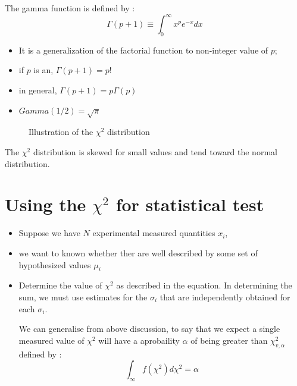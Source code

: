 \documentclass[a4paper,10pt]{article}
\begin{document}
The gamma function is defined by : 
\begin{equation}
  \Gamma (p +1)  \equiv \int^{\infty}_{0} x^p e^{-x} dx
 \end{equation}
 
 
\begin{itemize}
 \item It is a generalization of the factorial function to non-integer value of $p$;
 \item if $p$ is an, $\Gamma(p+1) = p!$
 \item in general, $\Gamma(p+1) = p\Gamma(p)$
 \item $Gamma(1/2) = \sqrt{\pi}$
\end{itemize}


\begin{figure}
\caption{Illustration of the $\chi^2$ distribution}
\end{figure}

The $\chi^2$ distribution is skewed for small values and tend toward the  normal distribution. 


\section{Using the $\chi^2$ for statistical test}

\begin{itemize}
 \item Suppose we have $N$ experimental measured quantities $x_i$,
 \item we want to known whether ther are well described by some set of hypothesized values $\mu_i$
 \item Determine the value of $\chi^2$ as described in the equation. In determining the sum, we must use estimates for the $\sigma_i$
  that are independently obtained for each $\sigma_i$. 
  
  
  We can generalise from above discussion, to say that we expect a single measured value of $\chi^2$ will have a aprobaility $\alpha$ of being greater
  than $\chi^2_{v,\alpha}$ defined by : 
  \begin{equation}
   \int^{}_{\infty} f(\chi^2) d\chi^2 = \alpha
  \end{equation}

\end{itemize}
\end{document}
